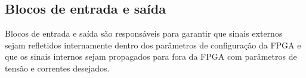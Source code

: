 \subsection{Blocos de entrada e saída}
\label{sec:iob}

Blocos de entrada e saída são responsáveis para garantir que sinais externos sejam refletidos internamente dentro dos parâmetros de configuração da FPGA e
que os sinais internos sejam propagados para fora da FPGA com parâmetros de tensão e correntes desejados.














